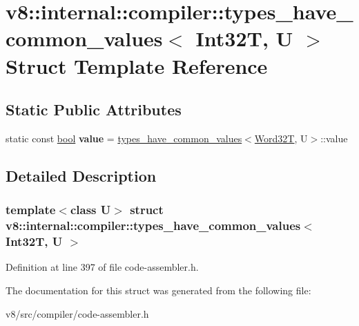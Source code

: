 \hypertarget{structv8_1_1internal_1_1compiler_1_1types__have__common__values_3_01Int32T_00_01U_01_4}{}\section{v8\+:\+:internal\+:\+:compiler\+:\+:types\+\_\+have\+\_\+common\+\_\+values$<$ Int32T, U $>$ Struct Template Reference}
\label{structv8_1_1internal_1_1compiler_1_1types__have__common__values_3_01Int32T_00_01U_01_4}
\subsection*{Static Public Attributes}
\begin{DoxyCompactItemize}
\item 
\mbox{\label{structv8_1_1internal_1_1compiler_1_1types__have__common__values_3_01Int32T_00_01U_01_4_a188904f5e3955f6c6d706fd26361bb68}} 
static const \mbox{\hyperlink{classbool}{bool}} {\bfseries value} = \mbox{\hyperlink{structv8_1_1internal_1_1compiler_1_1types__have__common__values}{types\+\_\+have\+\_\+common\+\_\+values}}$<$\mbox{\hyperlink{structv8_1_1internal_1_1Word32T}{Word32T}}, U$>$\+::value
\end{DoxyCompactItemize}


\subsection{Detailed Description}
\subsubsection*{template$<$class U$>$\newline
struct v8\+::internal\+::compiler\+::types\+\_\+have\+\_\+common\+\_\+values$<$ Int32\+T, U $>$}



Definition at line 397 of file code-\/assembler.\+h.



The documentation for this struct was generated from the following file\+:\begin{DoxyCompactItemize}
\item 
v8/src/compiler/code-\/assembler.\+h\end{DoxyCompactItemize}
